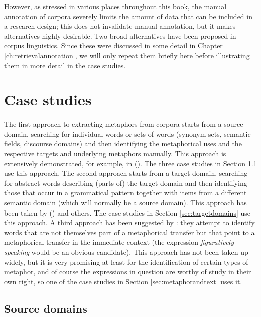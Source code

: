 However, as stressed in various places throughout this book, the manual annotation of corpora severely limits the amount of data that can be included in a research design; this does not invalidate manual annotation, but it makes alternatives highly desirable. Two broad alternatives have been proposed in corpus linguistics. Since these were discussed in some detail in Chapter \ref{ch:retrievalannotation}, we will only repeat them briefly here before illustrating them in more detail in the case studies.

\section{Case studies}
\label{sec:metaphorcasestudies}

The first approach to extracting metaphors from corpora starts from a source domain, searching for individual words or sets of words (synonym sets, semantic fields, discourse domains) and then identifying the metaphorical uses and the respective targets and underlying metaphors manually. This approach is extensively demonstrated, for example, in \citeauthor{deignan_corpus-based_1999} (\citeyear*{deignan_corpus-based_1999, deignan_metaphorical_1999, deignan_metaphor_2005}). The three case studies in Section \ref{sec:sourcedomains} use this approach. The second approach starts from a target domain, searching for abstract words describing (parts of) the target domain and then identifying those that occur in a grammatical pattern together with items from a different semantic domain (which will normally be a source domain). This approach has been taken by \citeauthor{stefanowitsch_happiness_2004} (\citeyear*{stefanowitsch_happiness_2004, stefanowitsch_words_2006}) and others. The case studies in Section \ref{sec:targetdomains} use this approach. A third approach has been suggested by \citet{wallington_metaphoricity_2003}: they attempt to identify words that are not themselves part of a metaphorical transfer but that point to a metaphorical transfer in the immediate context (the expression \textit{figuratively speaking} would be an obvious candidate). This approach has not been taken up widely, but it is very promising at least for the identification of certain types of metaphor, and of course the expressions in question are worthy of study in their own right, so one of the case studies in Section \ref{sec:metaphorandtext} uses it.

\subsection{Source domains}
\label{sec:sourcedomains}

